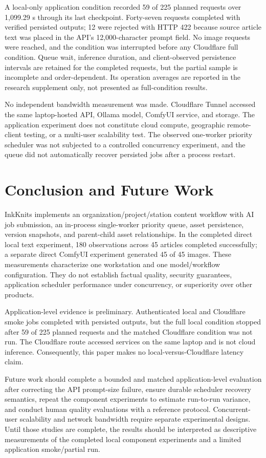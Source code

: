 \documentclass[conference]{IEEEtran}
\begin{document}
A local-only application condition recorded 59 of 225 planned requests over 1,099.29 s through its last checkpoint. Forty-seven requests completed with verified persisted outputs; 12 were rejected with HTTP 422 because source article text was placed in the API's 12,000-character prompt field. No image requests were reached, and the condition was interrupted before any Cloudflare full condition. Queue wait, inference duration, and client-observed persistence intervals are retained for the completed requests, but the partial sample is incomplete and order-dependent. Its operation averages are reported in the research supplement only, not presented as full-condition results.

No independent bandwidth measurement was made. Cloudflare Tunnel accessed the same laptop-hosted API, Ollama model, ComfyUI service, and storage. The application experiment does not constitute cloud compute, geographic remote-client testing, or a multi-user scalability test. The observed one-worker priority scheduler was not subjected to a controlled concurrency experiment, and the queue did not automatically recover persisted jobs after a process restart.

\section{Conclusion and Future Work}
InkKnits implements an organization/project/station content workflow with AI job submission, an in-process single-worker priority queue, asset persistence, version snapshots, and parent-child asset relationships. In the completed direct local text experiment, 180 observations across 45 articles completed successfully; a separate direct ComfyUI experiment generated 45 of 45 images. These measurements characterize one workstation and one model/workflow configuration. They do not establish factual quality, security guarantees, application scheduler performance under concurrency, or superiority over other products.

Application-level evidence is preliminary. Authenticated local and Cloudflare smoke jobs completed with persisted outputs, but the full local condition stopped after 59 of 225 planned requests and the matched Cloudflare condition was not run. The Cloudflare route accessed services on the same laptop and is not cloud inference. Consequently, this paper makes no local-versus-Cloudflare latency claim.

Future work should complete a bounded and matched application-level evaluation after correcting the API prompt-size failure, ensure durable scheduler recovery semantics, repeat the component experiments to estimate run-to-run variance, and conduct human quality evaluations with a reference protocol. Concurrent-user scalability and network bandwidth require separate experimental designs. Until those studies are complete, the results should be interpreted as descriptive measurements of the completed local component experiments and a limited application smoke/partial run.
\end{document}
